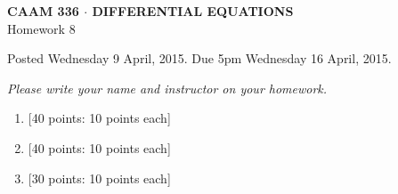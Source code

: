 \documentclass[10pt]{article}
\begin{document}
\vspace*{-5em}
\begin{center}
\large \textsf{\textbf{CAAM 336 $\cdot$ DIFFERENTIAL EQUATIONS}\\[0.5em]
Homework 8 }
\end{center}

Posted Wednesday 9 April, 2015.  Due 5pm Wednesday 16 April, 2015.
\begin{center}
\emph{Please write your name and instructor on your homework.}
\end{center}

\begin{enumerate}
\item {[40 points: 10 points each]}\\

\newpage
\item {[40 points: 10 points each]}\\


\newpage
\item {[30 points: 10 points each]}\\

%

\end{enumerate}
\end{document}
